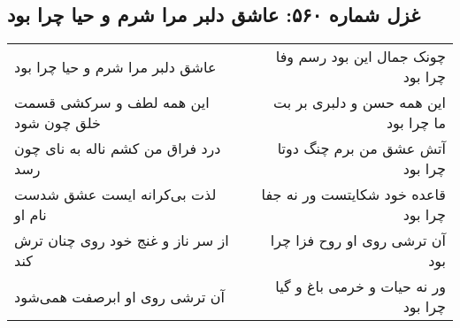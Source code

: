 \begin{center}
\section*{غزل شماره ۵۶۰: عاشق دلبر مرا شرم و حیا چرا بود}
\label{sec:0560}
\begin{longtable}{l p{0.5cm} r}
عاشق دلبر مرا شرم و حیا چرا بود
&&
چونک جمال این بود رسم وفا چرا بود
\\
این همه لطف و سرکشی قسمت خلق چون شود
&&
این همه حسن و دلبری بر بت ما چرا بود
\\
درد فراق من کشم ناله به نای چون رسد
&&
آتش عشق من برم چنگ دوتا چرا بود
\\
لذت بی‌کرانه ایست عشق شدست نام او
&&
قاعده خود شکایتست ور نه جفا چرا بود
\\
از سر ناز و غنج خود روی چنان ترش کند
&&
آن ترشی روی او روح فزا چرا بود
\\
آن ترشی روی او ابرصفت همی‌شود
&&
ور نه حیات و خرمی باغ و گیا چرا بود
\\
\end{longtable}
\end{center}
